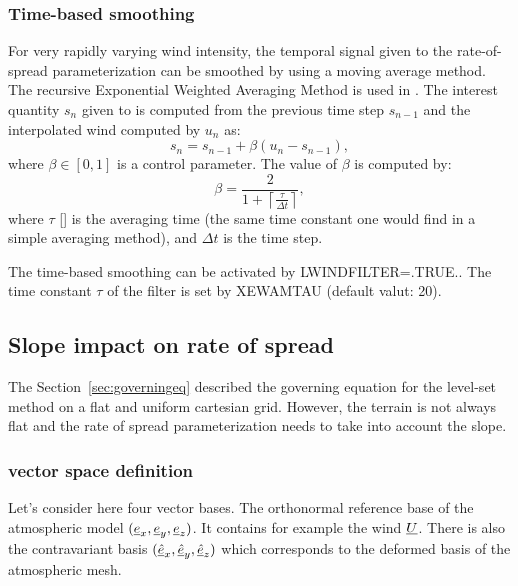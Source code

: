 \subsubsection{Time-based smoothing}

For very rapidly varying wind intensity, the temporal signal given to the rate-of-spread parameterization can be smoothed by using a moving average method. The recursive Exponential Weighted Averaging Method is used in \Blaze. The interest quantity $s_n$ given to \Blaze{} is computed from the previous time step $s_{n-1}$ and the interpolated wind computed by \MNH{} $u_n$ as:
\begin{equation}
  s_n = s_{n-1} + \beta (u_n - s_{n-1}),
\end{equation}
where $\beta \in [0, 1]$ is a control parameter.
The value of $\beta$ is computed by:
\begin{equation}
  \beta = \frac{2}{1 + \left \lceil \frac{\tau}{\Delta t} \right \rceil},
\end{equation}
where $\tau$ [\second] is the averaging time (the same time constant one would find in a simple averaging method), and $\Delta t$ is the \MNH{} time step.

The time-based smoothing can be activated by LWINDFILTER=.TRUE.. The time constant $\tau$ of the filter is set by XEWAMTAU (default valut: 20\second).

\subsection{Slope impact on rate of spread}

The Section~\ref{sec:governingeq} described the governing equation for the level-set method on a flat and uniform cartesian grid.
However, the terrain is not always flat and the rate of spread parameterization needs to take into account the slope.

\subsubsection{vector space definition}

Let's consider here four vector bases. The orthonormal reference base of the atmospheric model $(\underline{e}_x, \underline{e}_y, \underline{e}_z)$. It contains for example the wind $\underline{U}$. There is also the contravariant basis $(\underline{\hat e}_x, \underline{\hat e}_y , \underline{\hat e}_z)$ which corresponds to the deformed basis of the atmospheric mesh. 

